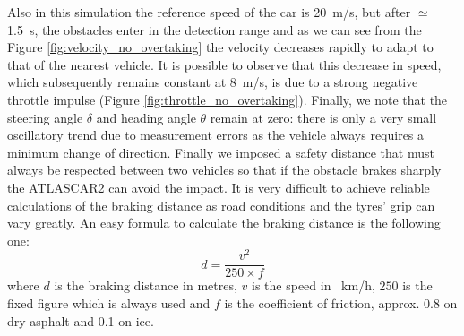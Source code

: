 Also in this simulation the reference speed of the car is \SI{20}{m/s}, but after $\simeq$\SI{1,5}{s}, the obstacles enter in the detection range and as we can see from the Figure \ref{fig:velocity_no_overtaking} the velocity decreases rapidly to adapt to that of the nearest vehicle. It is possible to observe that this decrease in speed, which subsequently remains constant at \SI{8}{m/s}, is due to a strong negative throttle impulse (Figure \ref{fig:throttle_no_overtaking}). Finally, we note that the steering angle $\delta$ and heading angle $\theta$ remain at zero: there is only a very small oscillatory trend due to measurement errors as the vehicle always requires a minimum change of direction.
Finally we imposed a safety distance that must always be respected between two vehicles so that if the obstacle brakes sharply the ATLASCAR2 can avoid the impact.
It is very difficult to achieve reliable calculations of the braking distance as road conditions and the tyres' grip can vary greatly. An easy formula to calculate the braking distance is the following one:
\begin{equation}
	d = \frac{v^2}{250\times f}
\end{equation}
where $d$ is the braking distance in metres, $v$ is the speed in \SI{}{km/h}, $250$ is the fixed figure which is always used and $f$ is the coefficient of friction, approx. 0.8 on dry asphalt and 0.1 on ice.
